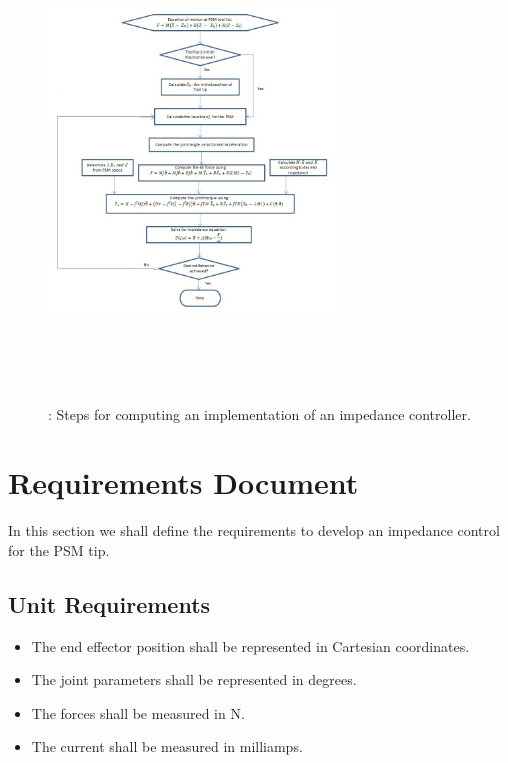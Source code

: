 \documentclass[10pt,journal,compsoc]{IEEEtran}
\begin{document}
\begin{figure}[htbp]
\begin{center}
\includegraphics[width=3in,height=5in]{comp_flow2.jpg}
\caption{: Steps for computing an implementation of an impedance controller.}
\label{fig:comp_flow2}
\end{center}
\end{figure}


\appendices

\section{Requirements Document}
In this section we shall define the requirements to develop an impedance control for the PSM tip.

\subsection{Unit Requirements}
\begin{itemize}
  \item The end effector position shall be represented in Cartesian coordinates.
  \item The joint parameters shall be represented in degrees.
  \item The forces shall be measured in N.
  \item The current shall be measured in milliamps.
\end{itemize}
\end{document}
